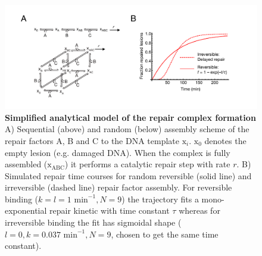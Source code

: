 \begin{figure}[h]
\begin{center}
\includegraphics[width=1\textwidth]{Abbildungen/figure2_5_2.pdf}
\caption{\textbf{Simplified analytical model of the repair complex formation} A) Sequential (above) and random (below) assembly scheme of the repair factors A, B and C to the DNA template $\text{x}_i$. $\text{x}_0$ denotes the empty lesion (e.g. damaged DNA). When the complex is fully assembled ($\text{x}_{\text{ABC}}$) it performs a catalytic repair step with rate $r$. B) Simulated repair time courses for random reversible (solid line) and irreversible (dashed line) repair factor assembly. For reversible binding ($k=l= \text{1 min}^{-1}, N=\text{9}$) the trajectory fits a mono-exponential repair kinetic with time constant $\tau$ whereas for irreversible binding the fit has sigmoidal shape ($l=\text{0}, k=\text{0.037 min}^{-1}, N=\text{9}$, chosen to get the same time constant).}
\label{fig:reactionTiming}
\end{center}
\end{figure}


